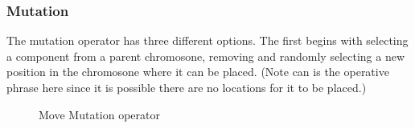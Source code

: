 \documentclass{article}
\begin{document}
\subsubsection{Mutation}
The mutation operator has three different options. The first begins with selecting a component from a parent chromosone, removing and randomly selecting a new position in the chromosone where it can be placed. (Note can is the operative phrase here since it is possible there are no locations for it to be placed.) 

\begin{figure}[ht]
\centering
{}
\caption{Move Mutation operator}
\end{figure}
\end{document}
